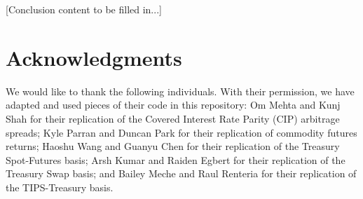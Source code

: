 \documentclass{article}
\begin{document}
[Conclusion content to be filled in...]

\section*{Acknowledgments}

We would like to thank the following individuals. With their permission, we have adapted and used pieces of their code in this repository: Om Mehta and Kunj Shah for their replication of the Covered Interest Rate Parity (CIP) arbitrage spreads; Kyle Parran and Duncan Park for their replication of commodity futures returns; Haoshu Wang and Guanyu Chen for their replication of the Treasury Spot-Futures basis; Arsh Kumar and Raiden Egbert for their replication of the Treasury Swap basis; and Bailey Meche and Raul Renteria for their replication of the TIPS-Treasury basis.


\end{document}
